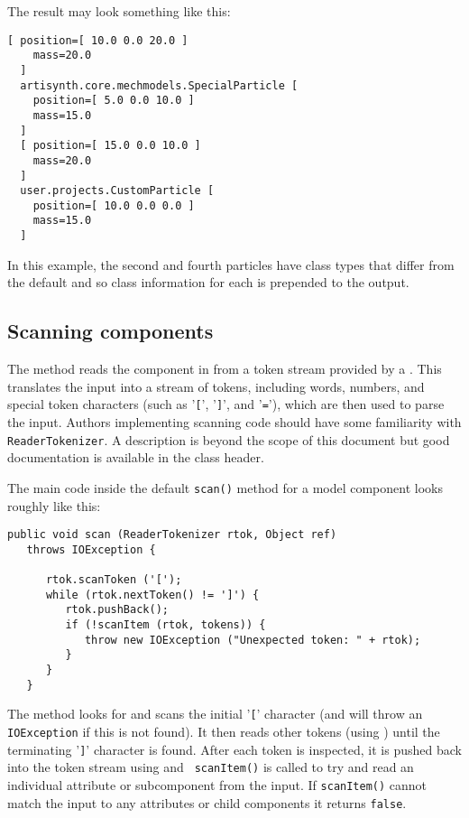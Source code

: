 \documentclass{article}
\begin{document}
The result may look something like this:
\begin{lstlisting}[]
  [ position=[ 10.0 0.0 20.0 ]
    mass=20.0
  ]
  artisynth.core.mechmodels.SpecialParticle [
    position=[ 5.0 0.0 10.0 ]
    mass=15.0
  ]
  [ position=[ 15.0 0.0 10.0 ]
    mass=20.0
  ]
  user.projects.CustomParticle [ 
    position=[ 10.0 0.0 0.0 ]
    mass=15.0
  ]
\end{lstlisting}
In this example, the second and fourth particles have class types that differ
from the default and so class information for each is prepended
to the output.

\subsection{Scanning components}
\label{scanningComponentsSec}

The  method reads the
component in from a token stream provided by a
. This translates the input
into a stream of tokens, including words, numbers, and special token
characters (such as '{\tt [}', '{\tt ]}', and '{\tt =}'), which are
then used to parse the input. Authors implementing 
scanning code should have some familiarity with {\tt ReaderTokenizer}.
A description is beyond the scope of this document but good
documentation is available in the  
class header.

The main code inside the default {\tt scan()} method for a model
component looks roughly like this:
\begin{lstlisting}[]
   public void scan (ReaderTokenizer rtok, Object ref) 
   throws IOException {

      rtok.scanToken ('[');
      while (rtok.nextToken() != ']') {
         rtok.pushBack();
         if (!scanItem (rtok, tokens)) {
            throw new IOException ("Unexpected token: " + rtok);
         }
      }
   }
\end{lstlisting}
The method looks for and scans the initial '{\tt [}' character (and
will throw an {\tt IOException} if this is not found). It then reads
other tokens (using
) until the
terminating '{\tt ]}' character is found. After each token is
inspected, it is pushed back into the token stream using
 and {\tt
scanItem()} is called to try and read an individual attribute or
subcomponent from the input. If {\tt scanItem()} cannot match the
input to any attributes or child components it returns {\tt false}.
\end{document}
